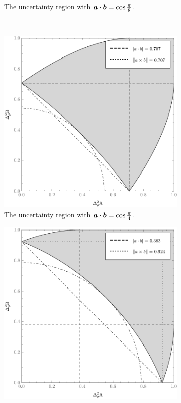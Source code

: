 \begin{figure}[H]
\begin{subfigure}[t]{0.38\textwidth}
    \caption{The uncertainty region with $\bm{a}\cdot\bm{b} = \cos\frac{\pi}{8}$.}
    \label{fig:err-region-pi-by-8}
  \end{subfigure}\\
  \begin{subfigure}[t]{0.38\textwidth}\centering
    \includegraphics[width=\textwidth]{figs/new-qubit-error-region-with-upper-and-lower-bounds-pi-by-4-bw}
    \caption{The uncertainty region with $\bm{a}\cdot\bm{b} = \cos\frac{\pi}{4}$.}
    \label{fig:err-region-pi-by-4}
  \end{subfigure}\hfill
  \begin{subfigure}[t]{0.38\textwidth}\centering
    \includegraphics[width=\textwidth]{figs/new-qubit-error-region-with-upper-and-lower-bounds-3-pi-by-8-bw}

\end{subfigure}
\end{figure}
